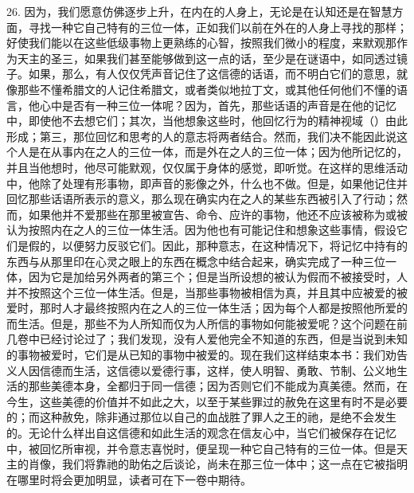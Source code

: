 26. 因为，我们愿意仿佛逐步上升，在内在的人身上，无论是在认知还是在智慧方面，寻找一种它自己特有的三位一体，正如我们以前在外在的人身上寻找的那样；好使我们能以在这些低级事物上更熟练的心智，按照我们微小的程度，来默观那作为天主的圣三，如果我们甚至能够做到这一点的话，至少是在谜语中，如同透过镜子。如果，那么，有人仅仅凭声音记住了这信德的话语，而不明白它们的意思，就像那些不懂希腊文的人记住希腊文，或者类似地拉丁文，或其他任何他们不懂的语言，他心中是否有一种三位一体呢？因为，首先，那些话语的声音是在他的记忆中，即使他不去想它们；其次，当他想象这些时，他回忆行为的精神视域（）由此形成；第三，那位回忆和思考的人的意志将两者结合。然而，我们决不能因此说这个人是在从事内在之人的三位一体，而是外在之人的三位一体；因为他所记忆的，并且当他想时，他尽可能默观，仅仅属于身体的感觉，即听觉。在这样的思维活动中，他除了处理有形事物，即声音的影像之外，什么也不做。但是，如果他记住并回忆那些话语所表示的意义，那么现在确实内在之人的某些东西被引入了行动；然而，如果他并不爱那些在那里被宣告、命令、应许的事物，他还不应该被称为或被认为按照内在之人的三位一体生活。因为他也有可能记住和想象这些事情，假设它们是假的，以便努力反驳它们。因此，那种意志，在这种情况下，将记忆中持有的东西与从那里印在心灵之眼上的东西在概念中结合起来，确实完成了一种三位一体，因为它是加给另外两者的第三个；但是当所设想的被认为假而不被接受时，人并不按照这个三位一体生活。但是，当那些事物被相信为真，并且其中应被爱的被爱时，那时人才最终按照内在之人的三位一体生活；因为每个人都是按照他所爱的而生活。但是，那些不为人所知而仅为人所信的事物如何能被爱呢？这个问题在前几卷中已经讨论过了；我们发现，没有人爱他完全不知道的东西，但是当说到未知的事物被爱时，它们是从已知的事物中被爱的。现在我们这样结束本书：我们劝告义人因信德而生活，这信德以爱德行事，这样，使人明智、勇敢、节制、公义地生活的那些美德本身，全都归于同一信德；因为否则它们不能成为真美德。然而，在今生，这些美德的价值并不如此之大，以至于某些罪过的赦免在这里有时不是必要的；而这种赦免，除非通过那位以自己的血战胜了罪人之王的祂，是绝不会发生的。无论什么样出自这信德和如此生活的观念在信友心中，当它们被保存在记忆中，被回忆所审视，并令意志喜悦时，便呈现一种它自己特有的三位一体。但是天主的肖像，我们将靠祂的助佑之后谈论，尚未在那三位一体中；这一点在它被指明在哪里时将会更加明显，读者可在下一卷中期待。\par



